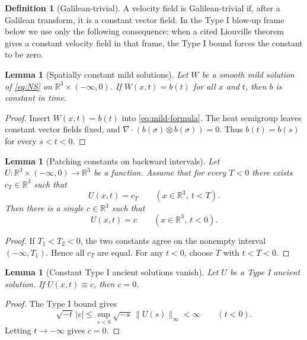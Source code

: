 \documentclass[11pt]{amsart}
\theoremstyle{plain}
\newtheorem{lemma}[theorem]{Lemma}
\theoremstyle{definition}
\newtheorem{definition}[theorem]{Definition}
\theoremstyle{remark}
\numberwithin{equation}{section}
\begin{document}
\begin{definition}[Galilean-trivial]
A velocity field is Galilean-trivial if, after a Galilean transform, it is a
constant vector field.  In the Type I blow-up frame below we use only the
following consequence: when a cited Liouville theorem gives a constant
velocity field in that frame, the Type I bound forces the constant to be zero.
\end{definition}

\begin{lemma}[Spatially constant mild solutions]\label{lem:spatial-constant-mild}
Let \(W\) be a smooth mild solution of \eqref{eq:NS} on
\(\mathbb R^3\times(-\infty,0)\).  If \(W(x,t)=b(t)\) for all \(x\) and \(t\),
then \(b\) is constant in time.
\end{lemma}

\begin{proof}
Insert \(W(x,t)=b(t)\) into \eqref{eq:mild-formula}.  The heat semigroup
leaves constant vector fields fixed, and
\(\nabla\cdot(b(\sigma)\otimes b(\sigma))=0\).  Thus
\(b(t)=b(s)\) for every \(s<t<0\).
\end{proof}

\begin{lemma}[Patching constants on backward intervals]
\label{lem:patch-constants}
Let \(U:\mathbb R^3\times(-\infty,0)\to\mathbb R^3\) be a function.  Assume
that for every \(T<0\) there exists \(c_T\in\mathbb R^3\) such that
\[
   U(x,t)=c_T\qquad(x\in\mathbb R^3,\ t<T).
\]
Then there is a single \(c\in\mathbb R^3\) such that
\[
   U(x,t)=c\qquad(x\in\mathbb R^3,\ t<0).
\]
\end{lemma}

\begin{proof}
If \(T_1<T_2<0\), the two constants agree on the nonempty interval
\((-\infty,T_1)\).  Hence all \(c_T\) are equal.  For any \(t<0\), choose
\(T\) with \(t<T<0\).
\end{proof}

\begin{lemma}[Constant Type I ancient solutions vanish]
\label{lem:galilean-typeI-zero}
Let \(U\) be a Type I ancient solution.  If \(U(x,t)\equiv c\), then
\(c=0\).
\end{lemma}

\begin{proof}
The Type I bound gives
\[
   \sqrt{-t}\,|c|
   \le
   \sup_{s<0}\sqrt{-s}\,\|U(s)\|_\infty<\infty
   \qquad(t<0).
\]
Letting \(t\to-\infty\) gives \(c=0\).
\end{proof}
\end{document}
